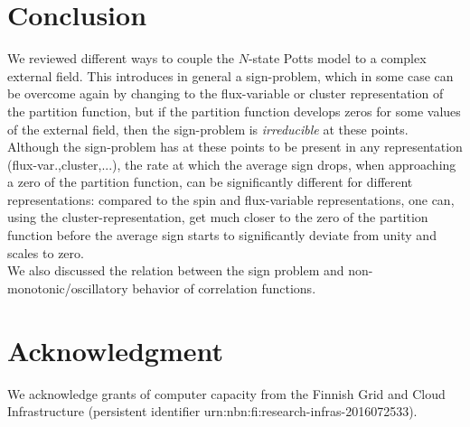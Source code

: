\documentclass[epj]{webofc}
\renewcommand*\[{\begin{equation}}
\renewcommand*\]{\end{equation}}
\let\oldemph\emph
\renewcommand*\emph[1]{\oldemph{\textcolor{emphcol}{#1}}}
\begin{document}
\section{Conclusion}\label{sec:conclusion}
We reviewed different ways to couple the $N$-state Potts model to a complex external field. This introduces in general a sign-problem, which in some case can be overcome again by changing to the flux-variable or cluster representation of the partition function, but if the partition function develops zeros for some values of the external field, then the sign-problem is \emph{irreducible} at these points. Although the sign-problem has at these points to be present in any representation (flux-var.,cluster,...), the rate at which the average sign drops, when approaching a zero of the partition function, can be significantly different for different representations: compared to the spin and flux-variable representations, one can, using the cluster-representation, get much closer to the zero of the partition function before the average sign starts to significantly deviate from unity and scales to zero.\\
We also discussed the relation between the sign problem and non-monotonic/oscillatory behavior of correlation functions.

\section{Acknowledgment}
We acknowledge grants of computer capacity from the Finnish Grid and Cloud Infrastructure (persistent identifier urn:nbn:fi:research-infras-2016072533).



\end{document}
